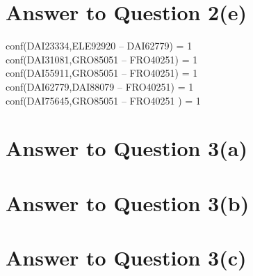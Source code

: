 \documentclass[11pt]{article}
\begin{document}
\pagebreak[4]
\section*{Answer to Question 2(e)}
conf(DAI23334,ELE92920 -- DAI62779) = 1 \\
conf(DAI31081,GRO85051 -- FRO40251) = 1 \\
conf(DAI55911,GRO85051 -- FRO40251) = 1 \\
conf(DAI62779,DAI88079 -- FRO40251) = 1 \\
conf(DAI75645,GRO85051 -- FRO40251 ) = 1 \\
\pagebreak[4]
\section*{Answer to Question 3(a)}

\pagebreak[4]
\section*{Answer to Question 3(b)}

\pagebreak[4]
\section*{Answer to Question 3(c)}
\end{document}
